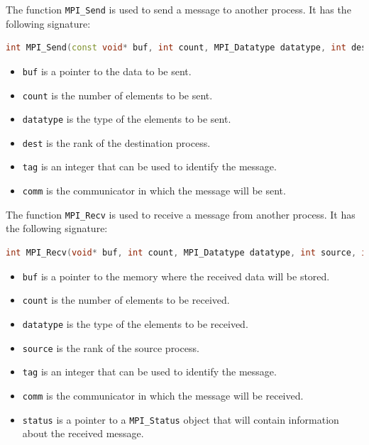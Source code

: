 The function \texttt{MPI\_Send} is used to send a message to another process. It has the
following signature:

\begin{lstlisting}[language=C++]
int MPI_Send(const void* buf, int count, MPI_Datatype datatype, int dest, int tag, MPI_Comm comm);
\end{lstlisting}

\begin{itemize}
    \item \texttt{buf} is a pointer to the data to be sent.
    \item \texttt{count} is the number of elements to be sent.
    \item \texttt{datatype} is the type of the elements to be sent.
    \item \texttt{dest} is the rank of the destination process.
    \item \texttt{tag} is an integer that can be used to identify the message.
    \item \texttt{comm} is the communicator in which the message will be sent.
\end{itemize}

The function \texttt{MPI\_Recv} is used to receive a message from another process. It has the
following signature:

\begin{lstlisting}[language=C++]
int MPI_Recv(void* buf, int count, MPI_Datatype datatype, int source, int tag, MPI_Comm comm, MPI_Status* status);
\end{lstlisting}

\begin{itemize}
    \item \texttt{buf} is a pointer to the memory where the received data will be stored.
    \item \texttt{count} is the number of elements to be received.
    \item \texttt{datatype} is the type of the elements to be received.
    \item \texttt{source} is the rank of the source process.
    \item \texttt{tag} is an integer that can be used to identify the message.
    \item \texttt{comm} is the communicator in which the message will be received.
    \item \texttt{status} is a pointer to a \texttt{MPI\_Status} object that will contain
    information about the received message.
\end{itemize}

